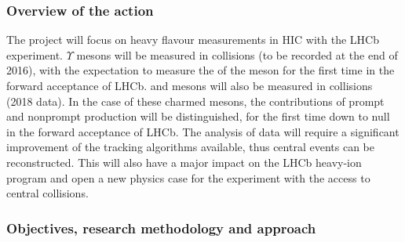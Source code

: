 \documentclass[a4paper,11pt]{article}
\begin{document}
\subsubsection{Overview of the action}

The project will focus on heavy flavour measurements in HIC with the LHCb experiment. $\Upsilon$ mesons will be measured in \pPb collisions (to be recorded at the end of 2016), with the expectation to measure the \rpa of the \PgUc meson for the first time in the forward acceptance of LHCb.
\Dz and \Jpsi mesons will also be measured in \pbpb collisions (2018 data). In the case of these charmed mesons, the contributions of prompt and nonprompt production will be distinguished, for the first time
down to null \pt in the forward acceptance of LHCb. The analysis of \pbpb data will require a significant improvement of the tracking algorithms available, thus
central events can be reconstructed. This will also have a major impact on the LHCb heavy-ion program and open a new physics case for the experiment with the access
to central \pbpb collisions.


\subsubsection{Objectives, research methodology and approach}\label{sec:objectives}

\end{document}
